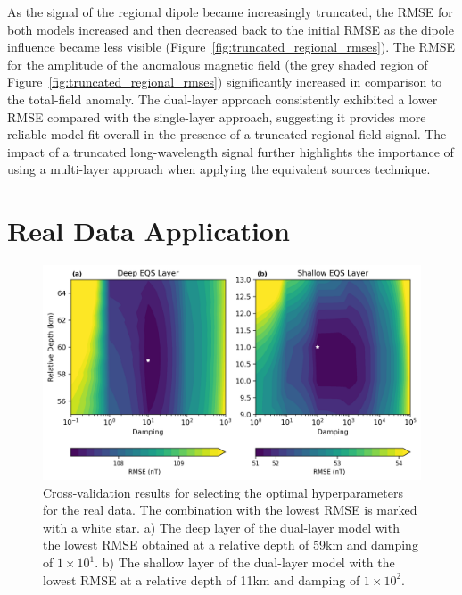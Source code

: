 As the signal of the regional dipole became increasingly truncated, the RMSE for both models increased and then decreased back to the initial RMSE as the dipole influence became less visible (Figure~\ref{fig:truncated_regional_rmses}). The RMSE for the amplitude of the anomalous magnetic field (the grey shaded region of Figure~\ref{fig:truncated_regional_rmses}) significantly increased in comparison to the total-field anomaly. The dual-layer approach consistently exhibited a lower RMSE compared with the single-layer approach, suggesting it provides more reliable model fit overall in the presence of a truncated regional field signal. The impact of a truncated long-wavelength signal further highlights the importance of using a multi-layer approach when applying the equivalent sources technique.


\section{Real Data Application}
\label{sec:real_application}

\begin{figure}[tb!]
\centering
\includegraphics[width=1\linewidth]{paper/figures/cv_real.png}
\caption{
    Cross-validation results for selecting the optimal hyperparameters for the real data. The combination with the lowest RMSE is marked with a white star. a) The deep layer of the dual-layer model with the lowest RMSE obtained at a relative depth of 59km and damping of $1 \times 10^1$. b) The shallow layer of the dual-layer model with the lowest RMSE at a relative depth of 11km and damping of $1 \times 10^2$.
}
\label{fig:cv_real}
\end{figure}


